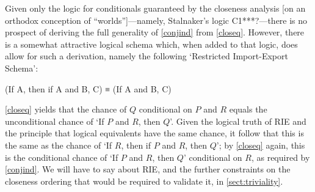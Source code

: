\documentclass[If.tex]{subfiles}
\begin{document}
Given only the logic for conditionals guaranteed by the closeness analysis [on an orthodox conception of “worlds”]---namely, Stalnaker's logic C1***?---there is no prospect of deriving the full generality of \ref{conjind} from \ref{closeq}.  However, there is a somewhat attractive logical schema which, when added to that logic, does allow for such a derivation, namely the following ‘Restricted Import-Export Schema’:
\begin{prop}
	\sitem[RIE]
	(If A, then if A and B, C) ≡ (If A and B, C) 
\end{prop}
\ref{closeq} yields that the chance of $Q$ conditional on $P$ and $R$ equals the unconditional chance of ‘If $P$ and $R$, then $Q$’.  Given the logical truth of RIE and the principle that logical equivalents have the same chance, it follow that this is the same as the chance of ‘If $R$, then if $P$ and $R$, then $Q$’; by \ref{closeq} again, this is the conditional chance of ‘If $P$ and $R$, then $Q$’ conditional on $R$, as required by \ref{conjind}.  We will have to say about RIE, and the further constraints on the closeness ordering that would be required to validate it, in \autoref{sect:triviality}.
\end{document}
